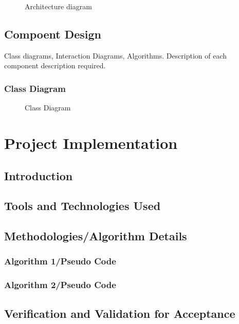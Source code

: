 \documentclass[oneside,a4paper,12pt]{report}
\begin{document}
\begin{normalsize}
 
\begin{center}
	\begin{figure}[!htbp]
		\centering
	  \caption{Architecture diagram}
	  \label{fig:arch-dig}
	\end{figure}
\end{center} 


\section{Compoent Design} 
Class diagrams, Interaction Diagrams, Algorithms. Description of each component description required.
\subsection{Class Diagram}
 \begin{center}
	\begin{figure}[!htbp]
		\centering
	  \caption{Class Diagram}
	  \label{fig:class-dig}
	\end{figure}
\end{center} 
 
\chapter{Project Implementation}
  \section{Introduction}
  \section{Tools and Technologies Used}
  \section{Methodologies/Algorithm Details}
  \subsection{Algorithm 1/Pseudo Code}
  \subsection{Algorithm 2/Pseudo Code}
  \section{Verification and Validation for Acceptance}
  \newpage

\end{normalsize}
\end{document}
